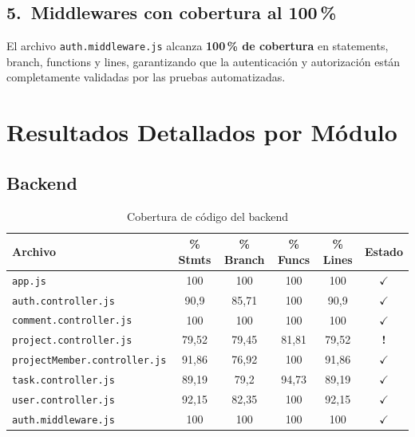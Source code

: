 \documentclass[12pt, a4paper]{article}
\newcommand{\ok}{\textcolor{accentgreen}{$\checkmark$}}
\newcommand{\warn}{\textcolor{accentorange}{\textbf{!}}}
\begin{document}
\subsection{5.\ Middlewares con cobertura al 100\,\%}

\begin{logrobox}
El archivo \texttt{auth.middleware.js} alcanza \textbf{100\,\% de cobertura} en
statements, branch, functions y lines, garantizando que la autenticación y
autorización están completamente validadas por las pruebas automatizadas.
\end{logrobox}

\section{Resultados Detallados por Módulo}

\subsection{Backend}

\begin{table}[H]
\centering
\renewcommand{\arraystretch}{1.4}
\begin{tabularx}{\linewidth}{Xccccc}
\toprule
\rowcolor{lightblue}
\textbf{Archivo} & \textbf{\% Stmts} & \textbf{\% Branch} & \textbf{\% Funcs}
& \textbf{\% Lines} & \textbf{Estado} \\
\midrule
\rowcolor{coverok}
\texttt{app.js}                      & 100    & 100    & 100    & 100    & \ok \\
\rowcolor{coverok}
\texttt{auth.controller.js}          & 90,9   & 85,71  & 100    & 90,9   & \ok \\
\rowcolor{coverok}
\texttt{comment.controller.js}       & 100    & 100    & 100    & 100    & \ok \\
\rowcolor{coverwarn}
\texttt{project.controller.js}       & 79,52  & 79,45  & 81,81  & 79,52  & \warn \\
\rowcolor{coverok}
\texttt{projectMember.controller.js} & 91,86  & 76,92  & 100    & 91,86  & \ok \\
\rowcolor{coverok}
\texttt{task.controller.js}          & 89,19  & 79,2   & 94,73  & 89,19  & \ok \\
\rowcolor{coverok}
\texttt{user.controller.js}          & 92,15  & 82,35  & 100    & 92,15  & \ok \\
\rowcolor{coverok}
\texttt{auth.middleware.js}          & 100    & 100    & 100    & 100    & \ok \\
\bottomrule
\end{tabularx}
\caption{Cobertura de código del backend}
\end{table}
\end{document}
